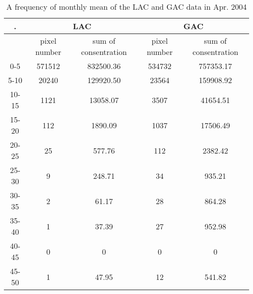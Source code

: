  \begin{table}[h]%
	\caption{A frequency of monthly mean of the LAC and GAC data in Apr. 2004}
	\label{frequency_04apr}
	\centering
	\begin{tabular}{c c c c c}%
		\hline \setlength{\arrayrulewidth}{0.8pt}. 
		&\multicolumn{2}{c}{LAC} 		&\multicolumn{2}{c}{GAC}\\ \hline
			& pixel number & sum of consentration & pixel number & sum of consentration \\ \hline
		0-5	&571512	&832500.36	&534732	&757353.17 \\ \hline
		5-10	&20240	&129920.50	&23564	&159908.92 \\ \hline
		10-15	&1121	&13058.07	&3507	&41654.51 \\ \hline
		15-20	&112	&1890.09	&1037	&17506.49 \\ \hline
		20-25	&25	&577.76	&112	&2382.42 \\ \hline
		25-30	&9	&248.71	&34	&935.21 \\ \hline
		30-35	&2	&61.17	&28	&864.28 \\ \hline 
		35-40	&1	&37.39	&27	&952.98 \\ \hline
		40-45	&0	&0	&0	&0 \\ \hline
		45-50	&1	&47.95	&12	&541.82 \\ \hline
		\end{tabular}
\end{table}
